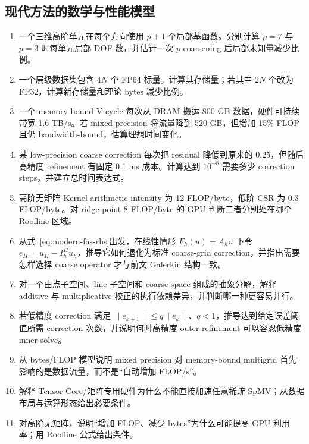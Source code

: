 \subsection*{现代方法的数学与性能模型}
\begin{enumerate}[label=\arabic*.]
\item 一个三维高阶单元在每个方向使用 $p+1$ 个局部基函数。分别计算 $p=7$ 与 $p=3$ 时每单元局部 DOF 数，并估计一次 $p$-coarsening 后局部未知量减少比例。
\item 一个层级数据集包含 $4N$ 个 FP64 标量。计算其存储量；若其中 $2N$ 个改为 FP32，计算新存储量和理论 bytes 减少比例。
\item 一个 memory-bound V-cycle 每次从 DRAM 搬运 800 GB 数据，硬件可持续带宽 1.6 TB/s。若 mixed precision 将流量降到 520 GB，但增加 15\% FLOP 且仍 bandwidth-bound，估算理想时间变化。
\item 某 low-precision coarse correction 每次把 residual 降低到原来的 0.25，但随后高精度 refinement 有固定 0.1 ms 成本。计算达到 $10^{-8}$ 需要多少 correction steps，并建立总时间表达式。
\item 高阶无矩阵 Kernel arithmetic intensity 为 12 FLOP/byte，低阶 CSR 为 0.3 FLOP/byte。对 ridge point 8 FLOP/byte 的 GPU 判断二者分别处在哪个 Roofline 区域。

\item 从式~\eqref{eq:modern-fas-rhs}出发，在线性情形 $F_h(u)=A_hu$ 下令 $e_H=u_H-I_h^H u_h$，推导它如何退化为标准 coarse-grid correction，并指出需要怎样选择 coarse operator 才与前文 Galerkin 结构一致。
\item 对一个由点子空间、line 子空间和 coarse space 组成的抽象分解，解释 additive 与 multiplicative 校正的执行依赖差异，并判断哪一种更容易并行。
\item 若低精度 correction 满足 $\|e_{k+1}\|\le q\|e_k\|$、$q<1$，推导达到给定误差阈值所需 correction 次数，并说明何时高精度 outer refinement 可以容忍低精度 inner solve。
\item 从 bytes/FLOP 模型说明 mixed precision 对 memory-bound multigrid 首先影响的是数据流量，而不是“自动增加 FLOP/s”。
\item 解释 Tensor Core/矩阵专用硬件为什么不能直接加速任意稀疏 SpMV；从数据布局与运算形态给出必要条件。
\item 对高阶无矩阵，说明“增加 FLOP、减少 bytes”为什么可能提高 GPU 利用率；用 Roofline 公式给出条件。
\end{enumerate}

